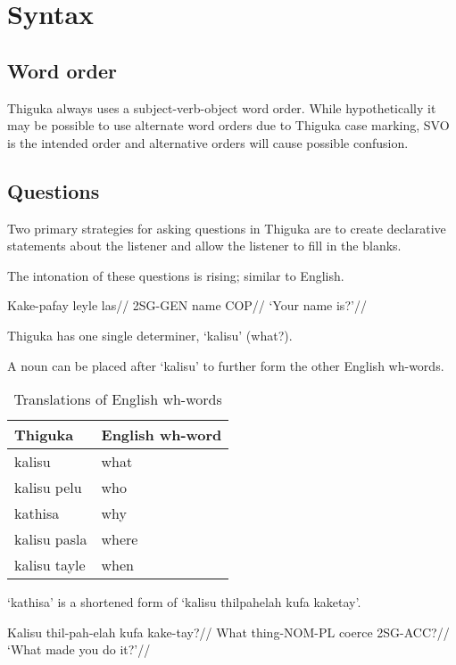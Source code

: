 

\chapter{Syntax}
\section{Word order}
Thiguka always uses a subject-verb-object word order.
While hypothetically it may be possible to use alternate word orders due to Thiguka case marking, SVO is the intended order and alternative orders will cause possible confusion.

\section{Questions}
Two primary strategies for asking questions in Thiguka are to create declarative statements about the listener and allow the listener to fill in the blanks.

The intonation of these questions is rising; similar to English.

\ex
\begingl
    \gla  Kake-pafay leyle las//
    \glb  2SG-GEN name COP//
    \glft `Your name is?'//
\endgl
\xe


Thiguka has one single determiner, `kalisu' (what?).

A noun can be placed after `kalisu' to further form the other English wh-words.

\begin{table}[h!]
    \centering
    \caption{Translations of English wh-words}
    \begin{tabularx}{8cm}{|X|X|}
        \hline
        \textbf{Thiguka} & \textbf{English wh-word} \\
        \hline
        kalisu & what \\
        kalisu pelu & who \\
        kathisa & why \\
        kalisu pasla & where \\
        kalisu tayle & when \\
        \hline
    \end{tabularx}
\end{table}

`kathisa' is a shortened form of `kalisu thilpahelah kufa kaketay'.

\ex
\begingl
    \gla  Kalisu thil-pah-elah kufa kake-tay?//
    \glb  What thing-NOM-PL coerce 2SG-ACC?//
    \glft `What made you do it?'//
\endgl
\xe


